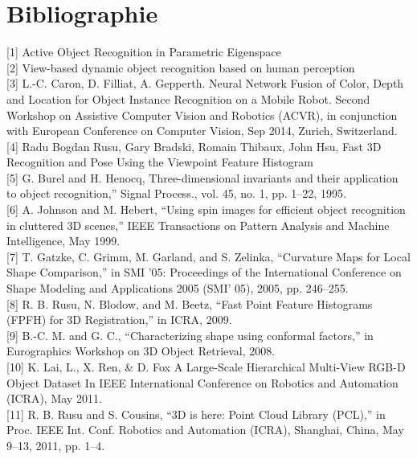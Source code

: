 \section{Bibliographie}

[1] Active Object Recognition in Parametric Eigenspace \\

[2] View-based dynamic object recognition based on human perception \\

[3] L.-C. Caron, D. Filliat, A. Gepperth. Neural Network Fusion of Color,
Depth and Location for Object Instance Recognition on a Mobile Robot. Second Workshop on
Assistive Computer Vision and Robotics (ACVR), in conjunction with European Conference
on Computer Vision, Sep 2014, Zurich, Switzerland.\\

[4] Radu Bogdan Rusu, Gary Bradski, Romain Thibaux, John Hsu,
Fast 3D Recognition and Pose Using the Viewpoint Feature Histogram \\

[5] G. Burel and H. Henocq, Three-dimensional invariants and their
application to object recognition,” Signal Process., vol. 45, no. 1, pp.
1–22, 1995. \\

[6] A. Johnson and M. Hebert, “Using spin images for efficient object
recognition in cluttered 3D scenes,” IEEE Transactions on Pattern
Analysis and Machine Intelligence, May 1999. \\

[7] T. Gatzke, C. Grimm, M. Garland, and S. Zelinka, “Curvature Maps
for Local Shape Comparison,” in SMI ’05: Proceedings of the International
Conference on Shape Modeling and Applications 2005 (SMI’
05), 2005, pp. 246–255. \\

[8] R. B. Rusu, N. Blodow, and M. Beetz, “Fast Point Feature Histograms
(FPFH) for 3D Registration,” in ICRA, 2009. \\

[9] B.-C. M. and G. C., “Characterizing shape using conformal factors,”
in Eurographics Workshop on 3D Object Retrieval, 2008. \\

[10] K. Lai, L., X. Ren, \& D. Fox  A Large-Scale Hierarchical Multi-View RGB-D Object Dataset In IEEE International Conference on Robotics and Automation (ICRA), May 2011. \\

[11] R. B. Rusu and S. Cousins, “3D is here: Point Cloud Library (PCL),”
in Proc. IEEE Int. Conf. Robotics and Automation (ICRA), Shanghai,
China, May 9–13, 2011, pp. 1–4. \\

